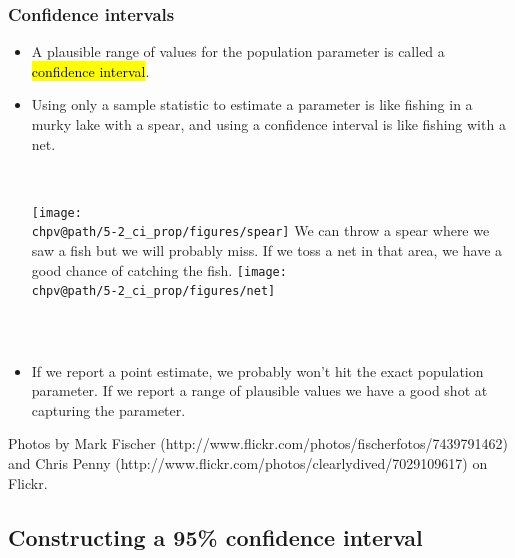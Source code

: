 \documentclass[t,compress,mathserif]{beamer}
\makeatletter
\def\chpv@path{../../Chp 5}
\makeatother
\begin{document}
\begin{frame}[shrink]
\frametitle{Confidence intervals}

\begin{itemize}

\item A plausible range of values for the population parameter is called a \hl{confidence interval}.

\item Using only a sample statistic to estimate a parameter is like fishing in a murky lake with a spear, and using a confidence interval is like fishing with a net.
$\:$ \\
$\:$ \\
\begin{columns}[c]
\texttt{[image: \\chpv@path/5-2\_ci\_prop/figures/spear]}
{\small
We can throw a spear where we saw a fish but we will probably miss. If we toss a net in that area, we have a good chance of catching the fish.
}
\texttt{[image: \\chpv@path/5-2\_ci\_prop/figures/net]}
\end{columns}
$\:$ \\
\item If we report a point estimate, we probably won't hit the exact population parameter. If we report a range of plausible values we have a good shot at capturing the parameter. 

\end{itemize}

{\tiny Photos by Mark Fischer (http://www.flickr.com/photos/fischerfotos/7439791462) and Chris Penny (http://www.flickr.com/photos/clearlydived/7029109617) on Flickr.}


\end{frame}


\subsection{Constructing a 95\% confidence interval}

\end{document}
